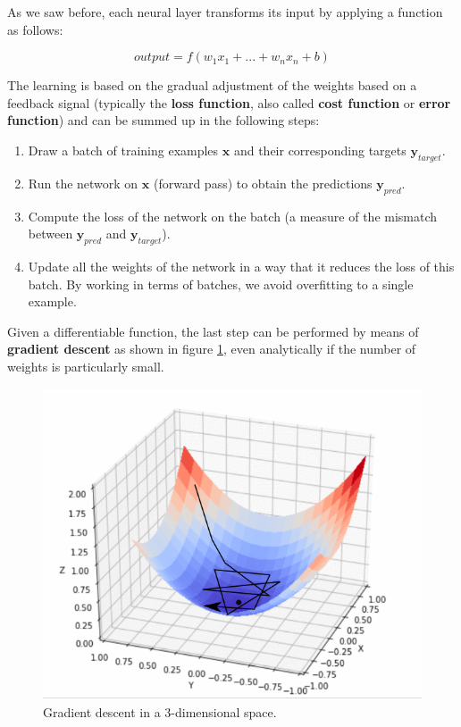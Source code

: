 As we saw before, each neural layer transforms its input by applying a function as follows:

\begin{equation*}
    output = f(w_1 x_1 + ... + w_n x_n + b)
\end{equation*}

The learning is based on the gradual adjustment of the weights based on a feedback signal (typically the \textbf{loss function}, also called \textbf{cost function} or \textbf{error function}) and can be summed up in the following steps:

\begin{enumerate}
    \item Draw a batch of training examples $\boldsymbol{x}$ and their corresponding targets $\boldsymbol{y}_{target}$.
    \item Run the network on $\boldsymbol{x}$ (forward pass) to obtain the predictions $\boldsymbol{y}_{pred}$.
    \item Compute the loss of the network on the batch (a measure of the mismatch between $\boldsymbol{y}_{pred}$ and $\boldsymbol{y}_{target}$).
    \item Update all the weights of the network in a way that it reduces the loss of this batch. By working in terms of batches, we avoid overfitting to a single example. 
\end{enumerate}

Given a differentiable function, the last step can be performed by means of \textbf{gradient descent} as shown in figure \ref{fig:ch6-gradientdescent}, even analytically if the number of weights is particularly small.

\begin{figure}[hb]
    \centering
    \includegraphics[scale=0.15]{Images/Chapter 6/gradient-descent.png}
    \caption{Gradient descent in a 3-dimensional space.}
    \label{fig:ch6-gradientdescent}
\end{figure}


